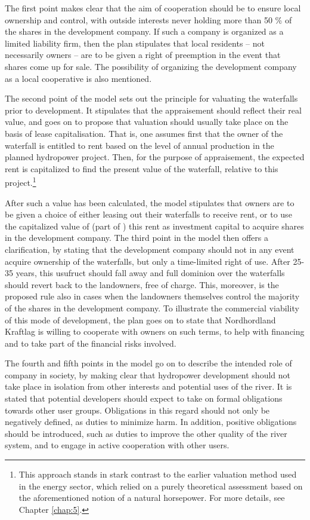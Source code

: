 The first point makes clear that the aim of cooperation should be to ensure local ownership and control, with outside interests never holding more than 50 \% of the shares in the development company. If such a company is organized as a limited liability firm, then the plan stipulates that local residents -- not necessarily owners -- are to be given a right of preemption in the event that shares come up for sale. The possibility of organizing the development company as a local cooperative is also mentioned.

The second point of the model sets out the principle for valuating the waterfalls prior to development. It stipulates that the appraisement should reflect their real value, and goes on to propose that valuation should usually take place on the basis of lease capitalisation. That is, one assumes first that the owner of the waterfall is entitled to rent based on the level of annual production in the planned hydropower project. Then, for the purpose of appraisement, the expected rent is capitalized to find the present value of the waterfall, relative to this project.\footnote{This approach stands in stark contrast to the earlier valuation method used in the energy sector, which relied on a purely theoretical assessment based on the aforementioned notion of a natural horsepower. For more details, see Chapter \ref{chap:5}.}

After such a value has been calculated, the model stipulates that owners are to be given a choice of either leasing out their waterfalls to receive rent, or to use the capitalized value of (part of ) this rent as investment capital to acquire shares in the development company. The third point in the model then offers a clarification, by stating that the development company should not in any event acquire ownership of the waterfalls, but only a time-limited right of use. After 25-35 years, this usufruct should fall away and full dominion over the waterfalls should revert back to the landowners, free of charge. This, moreover, is the proposed rule also in cases when the landowners themselves control the majority of the shares in the development company. To illustrate the commercial viability of this mode of development, the plan goes on to state that Nordhordland Kraftlag is willing to cooperate with owners on such terms, to help with financing and to take part of the financial risks involved.

The fourth and fifth points in the model go on to describe the intended role of company in society, by making clear that hydropower development should not take place in isolation from other interests and potential uses of the river. It is stated that potential developers should expect to take on formal obligations towards other user groups. Obligations in this regard should not only be negatively defined, as duties to minimize harm. In addition, positive obligations should be introduced, such as duties to improve the other quality of the river system, and to engage in active cooperation with other users.

